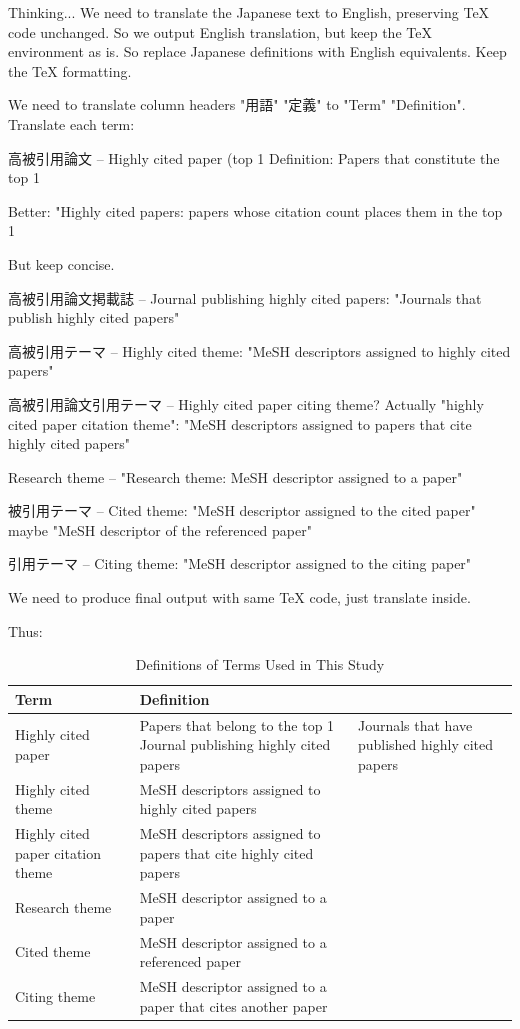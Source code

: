 Thinking...
We need to translate the Japanese text to English, preserving TeX code unchanged. So we output English translation, but keep the TeX environment as is. So replace Japanese definitions with English equivalents. Keep the TeX formatting.

We need to translate column headers "用語" "定義" to "Term" "Definition". Translate each term:

高被引用論文 – Highly cited paper (top 1%
Definition: Papers that constitute the top 1%

Better: "Highly cited papers: papers whose citation count places them in the top 1%

But keep concise.

高被引用論文掲載誌 – Journal publishing highly cited papers: "Journals that publish highly cited papers"

高被引用テーマ – Highly cited theme: "MeSH descriptors assigned to highly cited papers"

高被引用論文引用テーマ – Highly cited paper citing theme? Actually "highly cited paper citation theme": "MeSH descriptors assigned to papers that cite highly cited papers"

Research theme – "Research theme: MeSH descriptor assigned to a paper"

被引用テーマ – Cited theme: "MeSH descriptor assigned to the cited paper" maybe "MeSH descriptor of the referenced paper"

引用テーマ – Citing theme: "MeSH descriptor assigned to the citing paper"

We need to produce final output with same TeX code, just translate inside.

Thus:

\begin{table}[h]
\begin{center}
\caption{Definitions of Terms Used in This Study}
\label{tab:def}
{\small
\begin{tabular}{lp{32mm}}
Term & Definition \\
\hline
Highly cited paper & Papers that belong to the top 1%
Journal publishing highly cited papers & Journals that have published highly cited papers \\
Highly cited theme & MeSH descriptors assigned to highly cited papers \\
Highly cited paper citation theme & MeSH descriptors assigned to papers that cite highly cited papers \\
Research theme & MeSH descriptor assigned to a paper \\
Cited theme & MeSH descriptor assigned to a referenced paper \\
Citing theme & MeSH descriptor assigned to a paper that cites another paper \\
\end{tabular}
}
\end{center}
\end{table}

